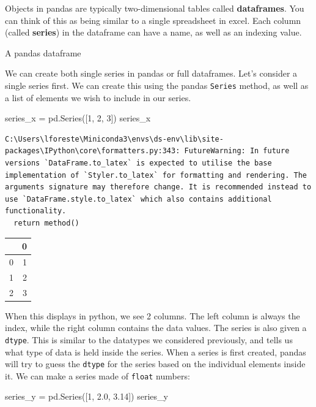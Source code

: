 \documentclass[
  letterpaper,
  DIV=11,
  numbers=noendperiod]{scrreprt}
\newenvironment{Shaded}{\begin{snugshade}}{\end{snugshade}}
\newcommand{\DecValTok}[1]{\textcolor[rgb]{0.68,0.00,0.00}{#1}}
\newcommand{\FloatTok}[1]{\textcolor[rgb]{0.68,0.00,0.00}{#1}}
\newcommand{\NormalTok}[1]{\textcolor[rgb]{0.00,0.23,0.31}{#1}}
\newcommand{\OperatorTok}[1]{\textcolor[rgb]{0.37,0.37,0.37}{#1}}
\begin{document}
Objects in pandas are typically two-dimensional tables called
\textbf{dataframes}. You can think of this as being similar to a single
spreadsheet in excel. Each column (called \textbf{series}) in the
dataframe can have a name, as well as an indexing value.

A pandas dataframe

We can create both single series in pandas or full dataframes. Let's
consider a single series first. We can create this using the pandas
\texttt{Series} method, as well as a list of elements we wish to include
in our series.

\begin{Shaded}
\begin{Highlighting}[]
\NormalTok{series\_x }\OperatorTok{=}\NormalTok{ pd.Series([}\DecValTok{1}\NormalTok{, }\DecValTok{2}\NormalTok{, }\DecValTok{3}\NormalTok{])}
\NormalTok{series\_x}
\end{Highlighting}
\end{Shaded}

\begin{verbatim}
C:\Users\lforeste\Miniconda3\envs\ds-env\lib\site-packages\IPython\core\formatters.py:343: FutureWarning: In future versions `DataFrame.to_latex` is expected to utilise the base implementation of `Styler.to_latex` for formatting and rendering. The arguments signature may therefore change. It is recommended instead to use `DataFrame.style.to_latex` which also contains additional functionality.
  return method()
\end{verbatim}

\begin{tabular}{lr}
\toprule
{} &  0 \\
\midrule
0 &  1 \\
1 &  2 \\
2 &  3 \\
\bottomrule
\end{tabular}

When this displays in python, we see 2 columns. The left column is
always the index, while the right column contains the data values. The
series is also given a \texttt{dtype}. This is similar to the datatypes
we considered previously, and tells us what type of data is held inside
the series. When a series is first created, pandas will try to guess the
\texttt{dtype} for the series based on the individual elements inside
it. We can make a series made of \texttt{float} numbers:

\begin{Shaded}
\begin{Highlighting}[]
\NormalTok{series\_y }\OperatorTok{=}\NormalTok{ pd.Series([}\DecValTok{1}\NormalTok{, }\FloatTok{2.0}\NormalTok{, }\FloatTok{3.14}\NormalTok{])}
\NormalTok{series\_y}
\end{Highlighting}
\end{Shaded}
\end{document}
